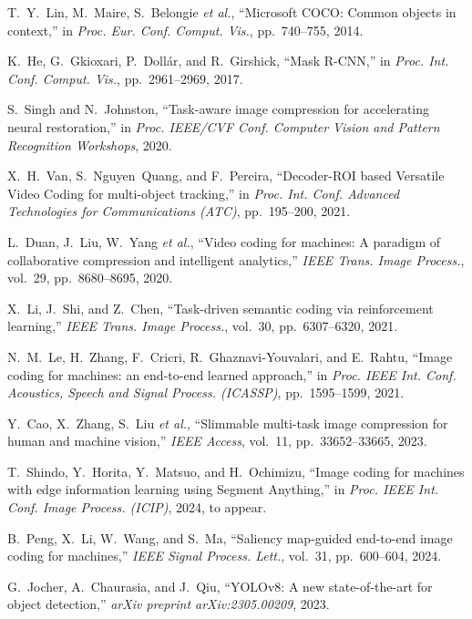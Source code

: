 \documentclass[conference]{IEEEtran}
\begin{document}
\begin{thebibliography}{00}
T.~Y.~Lin, M.~Maire, S.~Belongie \textit{et al.}, ``Microsoft COCO: Common objects in context,'' in \textit{Proc. Eur. Conf. Comput. Vis.}, pp.~740--755, 2014.

K.~He, G.~Gkioxari, P.~Dollár, and R.~Girshick, ``Mask R-CNN,'' in \textit{Proc. Int. Conf. Comput. Vis.}, pp.~2961--2969, 2017.

 S.~Singh and N.~Johnston, ``Task-aware image compression for accelerating neural restoration,'' in \textit{Proc. IEEE/CVF Conf. Computer Vision and Pattern Recognition Workshops}, 2020.

 X.~H.~Van, S.~Nguyen~Quang, and F.~Pereira, ``Decoder-ROI based Versatile Video Coding for multi-object tracking,'' in \textit{Proc. Int. Conf. Advanced Technologies for Communications (ATC)}, pp.~195--200, 2021.

 L.~Duan, J.~Liu, W.~Yang \textit{et al.}, ``Video coding for machines: A paradigm of collaborative compression and intelligent analytics,'' \textit{IEEE Trans. Image Process.}, vol.~29, pp.~8680--8695, 2020.

 X.~Li, J.~Shi, and Z.~Chen, ``Task-driven semantic coding via reinforcement learning,'' \textit{IEEE Trans. Image Process.}, vol.~30, pp.~6307--6320, 2021.

 N.~M.~Le, H.~Zhang, F.~Cricri, R.~Ghaznavi-Youvalari, and E.~Rahtu, ``Image coding for machines: an end-to-end learned approach,'' in \textit{Proc. IEEE Int. Conf. Acoustics, Speech and Signal Process. (ICASSP)}, pp.~1595--1599, 2021.

 Y.~Cao, X.~Zhang, S.~Liu \textit{et al.}, ``Slimmable multi-task image compression for human and machine vision,'' \textit{IEEE Access}, vol.~11, pp.~33652--33665, 2023.

 T.~Shindo, Y.~Horita, Y.~Matsuo, and H.~Ochimizu, ``Image coding for machines with edge information learning using Segment Anything,'' in \textit{Proc. IEEE Int. Conf. Image Process. (ICIP)}, 2024, to appear.

 B.~Peng, X.~Li, W.~Wang, and S.~Ma, ``Saliency map-guided end-to-end image coding for machines,'' \textit{IEEE Signal Process. Lett.}, vol.~31, pp.~600--604, 2024.

 G.~Jocher, A.~Chaurasia, and J.~Qiu, ``YOLOv8: A new state-of-the-art for object detection,'' \textit{arXiv preprint arXiv:2305.00209}, 2023.


\end{thebibliography}
\end{document}
